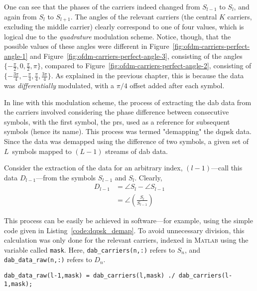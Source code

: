 \documentclass[class=report,11pt,crop=false]{standalone}
\begin{document}
One can see that the phases of the carriers indeed changed from \(S_{l-1}\) to \(S_{l}\), and again from \(S_{l}\) to \(S_{l+1}\). The angles of the relevant carriers (the central \(K\) carriers, excluding the middle carrier) clearly correspond to one of four values, which is logical due to the \emph{quadrature} modulation scheme. Notice, though, that the possible values of these angles were different in Figure~\ref{fig:ofdm-carriers-perfect-angle-1} and Figure~\ref{fig:ofdm-carriers-perfect-angle-3}, consisting of the angles \(\{-\frac{\pi}{2}, 0, \frac{\pi}{2}, \pi\}\), compared to Figure~\ref{fig:ofdm-carriers-perfect-angle-2}, consisting of \(\{-\frac{3\pi}{4}, -\frac{\pi}{4},\frac{\pi}{4}, \frac{3\pi}{4}\}\). As explained in the previous chapter, this is because the data was \emph{differentially} modulated, with a \(\pi/4\) offset added after each symbol.

In line with this modulation scheme, the process of extracting the \gls{dab} data from the carriers involved considering the phase difference between consecutive symbols, with the first symbol, the \gls{prs}, used as a reference for subsequent symbols (hence its name). This process was termed "demapping" the \gls{dqpsk} data. Since the data was demapped using the difference of two symbols, a given set of \(L\)~symbols mapped to \((L-1)\) streams of \gls{dab} data.

Consider the extraction of the data for an arbitrary index, \((l-1)\)---call this data \(D_{l-1}\)---from the symbols \(S_{l-1}\) and \(S_{l}\). Clearly,
\begin{align}
  D_{l-1} &= \angle S_{l} - \angle S_{l-1}\\
          &= \angle\left(\frac{S_{l}}{S_{l-1}}\right)
\end{align}

This process can be easily be achieved in software---for example, using the simple code given in Listing~\ref{code:dqpsk_demap}. To avoid unnecessary division, this calculation was only done for the relevant carriers, indexed in \textsc{Matlab} using the variable called \texttt{mask}. Here, \texttt{dab\_carriers(n,:)} refers to \(S_n\), and \texttt{dab\_data\_raw(n,:)} refers to \(D_n\).

\begin{lstlisting}[caption={\textsc{Matlab} code for demapping \gls{dab} carriers into \gls{dqpsk} data},label={code:dqpsk_demap}]
dab_data_raw(l-1,mask) = dab_carriers(l,mask) ./ dab_carriers(l-1,mask);
\end{lstlisting}
\end{document}
